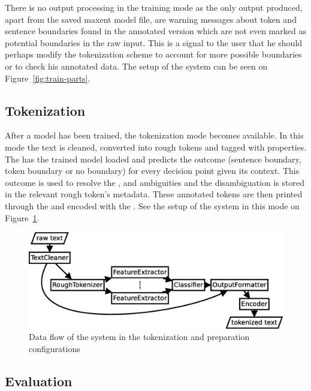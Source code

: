 There is no output processing in the training mode as the only output produced,
apart from the saved maxent model file, are warning messages about token and
sentence boundaries found in the annotated version which are not even marked as
potential boundaries in the raw input. This is a signal to the user that he
should perhaps modify the tokenization scheme to account for more possible
boundaries or to check his annotated data. The setup of the system can be seen
on Figure~\ref{fig:train-parts}.

\subsection{Tokenization}
\label{ssec:impl-modes-tokenize}

After a model has been trained, the tokenization mode becomes available. In
this mode the text is cleaned, converted into rough tokens and tagged with
properties. The  has the trained model loaded and predicts
the outcome (sentence boundary, token boundary or no boundary) for every
decision point given its context. This outcome is used to resolve the
\maysplit{}, \mayjoin{} and \maybreaksentence{} ambiguities and the
disambiguation is stored in the relevant rough token's metadata. These
annotated tokens are then printed through the  and
encoded with the . See the setup of the system in this mode on
Figure~\ref{fig:tokenize-parts}.

\begin{figure}
  \includegraphics[width=\textwidth]{img/tokenize-parts.eps}
  \caption{Data flow of the system in the tokenization and preparation
           configurations}
  \label{fig:tokenize-parts}
\end{figure}

\subsection{Evaluation}
\label{ssec:impl-modes-evaluate}


